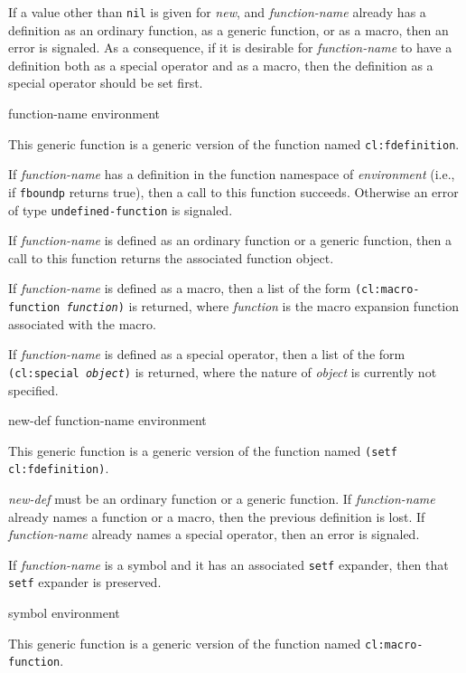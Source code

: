 If a value other than \texttt{nil} is given for \textit{new}, and
\textit{function-name} already has a definition as an ordinary
function, as a generic function, or as a macro, then an error is
signaled.  As a consequence, if it is desirable for
\textit{function-name} to have a definition both as a special operator
and as a macro, then the definition as a special operator should be
set first.

 {function-name environment}

This generic function is a generic version of the \commonlisp{}
function named \texttt{cl:fdefinition}.

If \textit{function-name} has a definition in the function namespace
of \textit{environment} (i.e., if \texttt{fboundp} returns true), then
a call to this function succeeds.  Otherwise an error of type
\texttt{undefined-function} is signaled.

If \textit{function-name} is defined as an ordinary function or a generic
function, then a call to this function returns the associated
function object.

If \textit{function-name} is defined as a macro, then a list of the form
\texttt{(cl:macro-function \textrm{\textit{function}})} is returned, where
\textit{function} is the macro expansion function associated with the
macro.

If \textit{function-name} is defined as a special operator, then a
list of the form \texttt{(cl:special \textrm{\textit{object}})} is
returned, where the nature of \textit{object} is currently not
specified.

 {new-def function-name environment}

This generic function is a generic version of the \commonlisp{}
function named \texttt{(setf cl:fdefinition)}.

\textit{new-def} must be an ordinary function or a generic function.
If \textit{function-name} already names a function or a macro, then
the previous definition is lost.  If \textit{function-name} already
names a special operator, then an error is signaled.

If \textit{function-name} is a symbol and it has an associated
\texttt{setf} expander, then that \texttt{setf} expander is preserved.

 {symbol environment}

This generic function is a generic version of the \commonlisp{}
function named \texttt{cl:macro-function}.


